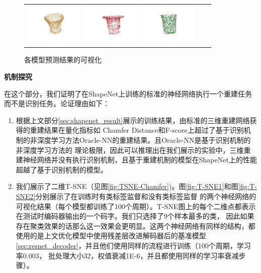\documentclass[bachelor, nocolorlinks, printoneside]{seuthesis} %
\begin{document}
\begin{Main}
\begin{figure}[!h]
\begin{tabular}{c@{}c@{}c@{}c@{}c@{}}
    	\includegraphics[width=0.22\columnwidth,height=2cm]{figs/real_dataset/AE_label/jar_d56098d4d83f5976a2c59a4d90e63212_fine.png} &
    	\includegraphics[width=0.22\columnwidth,height=2cm]{figs/real_dataset/AE/jar_d56098d4d83f5976a2c59a4d90e63212_fine.png} &
    	\includegraphics[width=0.22\columnwidth,height=2cm]{figs/real_dataset/oracle/jar_d56098d4d83f5976a2c59a4d90e63212_oracle.png}
    	\\
    \end{tabular}
    \caption{\small 各模型预测结果的可视化}
    \label{fig:visualize_KC}
\end{figure}

\FloatBarrier

\noindent
\textbf{机制探究}

在这个部分，我们证明了在ShapeNet上训练的标准的神经网络执行一个重建任务而不是识别任务。论证理由如下：
\begin{enumerate}
    \item 根据上文部分\ref{sec:shapenet_result}展示的训练结果，由标准的三维重建网络获得的重建结果在量化指标如
    Chamfer Distance和F-score上超过了基于识别机制的非深度学习方法Oracle-NN的重建结果。且Oracle-NN是基于识别机制的非深度学习方法的
    理论极限，因此可以推理出在我们展示的实验中，三维重建神经网络并没有执行识别机制，且基于重建机制的模型在ShapeNet上的性能超越了基于识别机制的模型。
    \item 我们展示了二维T-SNE（见图\ref{fig:TSNE-Chamfer})。图\ref{fig:T-SNE1}和图\ref{fig:T-SNE2}分别展示了在训练时有类标签监督和没有类标签监督
    的两个神经网络的可视化结果（每个模型都训练了100个周期）。T-SNE图上的每个二维点都表示在测试时编码器输出的一个码字。我们只选择了9个样本最多的类，
    因此如果存在聚类效果的话那么这一效果会更明显。这两个神经网络有同样的结构，都使用的是上文优化模型中使用残差层改进解码器后的基准模型\ref{sec:resnet_decoder}，并且他们使用同样的流程进行训练（100个周期，学习率0.003，
    批处理大小32，权值衰减1E-6，并且都使用同样的学习率衰减步骤）。


\end{enumerate}
\end{Main}
\end{document}
